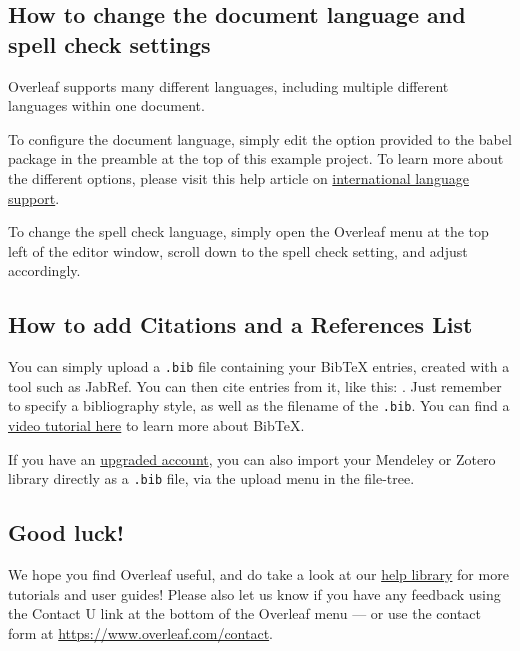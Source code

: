 \documentclass{article}
\begin{document}
\subsection{How to change the document language and spell check settings}

Overleaf supports many different languages, including multiple different languages within one document. 

To configure the document language, simply edit the option provided to the babel package in the preamble at the top of this example project. To learn more about the different options, please visit this help article on \href{https://www.overleaf.com/learn/latex/International_language_support}{international language support}.

To change the spell check language, simply open the Overleaf menu at the top left of the editor window, scroll down to the spell check setting, and adjust accordingly.

\subsection{How to add Citations and a References List}

You can simply upload a \verb|.bib| file containing your BibTeX entries, created with a tool such as JabRef. You can then cite entries from it, like this: \cite{greenwade93}. Just remember to specify a bibliography style, as well as the filename of the \verb|.bib|. You can find a \href{https://www.overleaf.com/help/97-how-to-include-a-bibliography-using-bibtex}{video tutorial here} to learn more about BibTeX.

If you have an \href{https://www.overleaf.com/user/subscription/plans}{upgraded account}, you can also import your Mendeley or Zotero library directly as a \verb|.bib| file, via the upload menu in the file-tree.

\subsection{Good luck!}

We hope you find \cite{greenwade93}Overleaf useful, and do take a look at our \href{https://www.overleaf.com/learn}{help library} for more tutorials and user guides! Please also let us know if you have any feedback using the Contact U\cite{luo2019commerce} link at the bottom of the Overleaf menu --- or use the contact form at \url{https://www.overleaf.com/contact}.



\end{document}
